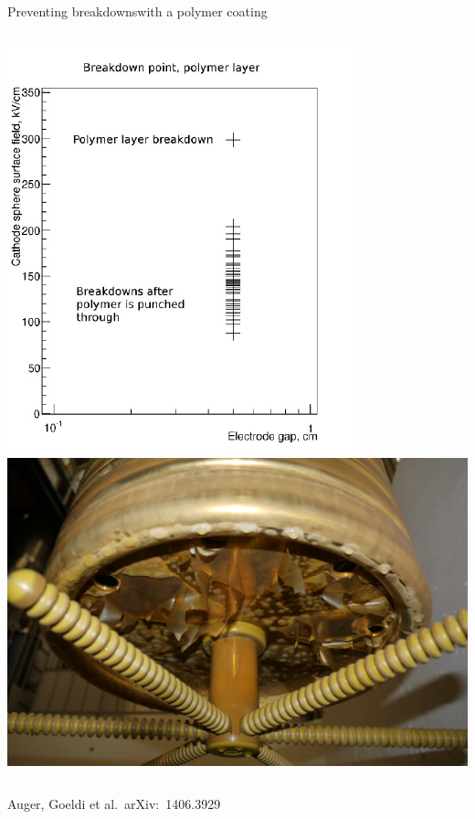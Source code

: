 \documentclass[]{beamer}
\begin{document}
\begin{frame}{Preventing breakdowns}{with a polymer coating}
\begin{columns}[c]
		\includegraphics[width=\textwidth]{defence/breakdown_latex}
		\centering
		\includegraphics[height=.95\textwidth, angle=90]{defence/AT_cathode}
	\end{columns}
	\centering
	{\tiny Auger, Goeldi et al.\ arXiv:~1406.3929~\cite{latex}}\\
\end{frame}
\end{document}
